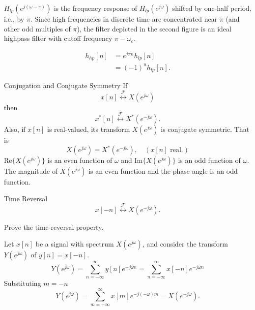 \begin{frame}
    {
        \begin{figure}
            \centering
            
        \end{figure}

    }
    $H_{lp}(e^{j(\omega - \pi)})$ is the frequency response of $H_{lp}(e^{j\omega})$ shifted by one-half period, i.e., by $\pi$. Since high frequencies in discrete time are concentrated near $\pi$ (and other odd multiples of $\pi$), the filter depicted in the second figure is an ideal highpass filter with cutoff frequency $\pi - \omega_c$.

    \begin{align*}
        h_{hp}[n] &= e^{j\pi n}h_{lp}[n] \\
        &= (-1)^n h_{lp}[n].
    \end{align*}
\end{frame}

\begin{frame}{Conjugation and Conjugate Symmetry}
    If
    \begin{equation*}
        x[n] \overset{\mathcal{F}}{\leftrightarrow} X(e^{j\omega})
    \end{equation*}
    then
    \begin{equation*}
        x^\ast[n] \overset{\mathcal{F}}{\leftrightarrow} X^\ast(e^{-j\omega}).
    \end{equation*}
    Also, if $x[n]$ is real-valued, its transform $X(e^{j\omega})$ is conjugate symmetric. That is
    \begin{equation*}
        X(e^{j\omega}) = X^\ast(e^{-j\omega}), \quad (x[n] \text{ real}.)
    \end{equation*}
    $\mathrm{Re}\{X(e^{j\omega})\}$ is an even function of $\omega$ and  $\mathrm{Im}\{X(e^{j\omega})\}$ is an odd function of $\omega$.\\
    The magnitude of $X(e^{j\omega})$ is an even function and the phase angle is an odd function.
\end{frame}
%
%
%

\begin{frame}{Time Reversal}
    \begin{equation*}
        x[-n] \overset{\mathcal{F}}{\leftrightarrow} X(e^{-j\omega}).
    \end{equation*}
    \begin{example}
        Prove the time-reversal property.
    \end{example}
    \pause
    {
        Let $x[n]$ be a signal with spectrum $X(e^{j\omega})$, and consider the transform $Y(e^{j\omega})$ of $y[n] = x[-n]$.
        \begin{equation*}
            Y(e^{j\omega}) = \sum_{n=-\infty}^{\infty}y[n] e^{-j\omega n} = \sum_{n=-\infty}^{\infty}x[-n] e^{-j\omega n}
        \end{equation*}
        Substituting $m=-n$
        \begin{equation*}
            Y(e^{j\omega}) = \sum_{m=-\infty}^{\infty}x[m] e^{-j(-\omega)m} = X(e^{-j\omega}).
        \end{equation*}
    }
\end{frame}

